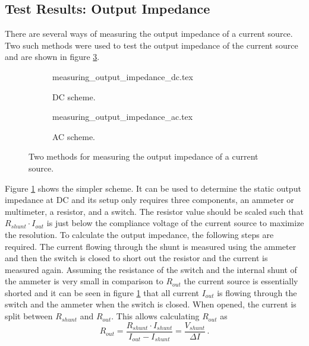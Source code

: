 \subsection{Test Results: Output Impedance}%
\label{sec:output_impedance}
There are several ways of measuring the output impedance of a current source. Two such methods were used to test the output impedance of the current source and are shown in figure \ref{fig:measuring_output_impedance}.
\begin{figure}[ht]
    \centering
    \begin{subfigure}{0.35\linewidth}
        \centering
        {measuring_output_impedance_dc.tex}
        \caption{DC scheme.}
        \label{fig:measuring_output_impedance_dc}
    \end{subfigure}
    \begin{subfigure}{0.55\linewidth}
        \centering
        {measuring_output_impedance_ac.tex}
        \caption{AC scheme.}
        \label{fig:measuring_output_impedance_ac}
    \end{subfigure}
    \caption{Two methods for measuring the output impedance of a current source.}
    \label{fig:measuring_output_impedance}
\end{figure}
Figure \ref{fig:measuring_output_impedance_dc} shows the simpler scheme. It can be used to determine the static output impedance at DC and its setup only requires three components, an ammeter or multimeter, a resistor, and a switch. The resistor value should be scaled such that $R_{shunt} \cdot I_{out}$ is just below the compliance voltage of the current source to maximize the resolution. To calculate the output impedance, the following steps are required. The current flowing through the shunt is measured using the ammeter and then the switch is closed to short out the resistor and the current is measured again. Assuming the resistance of the switch and the internal shunt of the ammeter is very small in comparison to $R_{out}$ the current source is essentially shorted and it can be seen in figure \ref{fig:measuring_output_impedance_dc} that all current $I_{out}$ is flowing through the switch and the ammeter when the switch is closed. When opened, the current is split between $R_{shunt}$ and $R_{out}$. This allows calculating $R_{out}$ as
\begin{equation}
    R_{out} = \frac{R_{shunt} \cdot I_{shunt}}{I_{out} - I_{shunt}} = \frac{V_{shunt}}{\Delta I}\,. \label{eqn:output_impedance_dc}
\end{equation}


